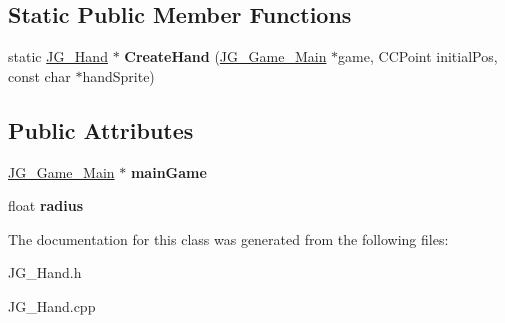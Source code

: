 \subsection*{Static Public Member Functions}
\begin{DoxyCompactItemize}
\item 
\hypertarget{class_j_g___hand_a9154307d939ba402a3412a6ff9909247}{static \hyperlink{class_j_g___hand}{J\-G\-\_\-\-Hand} $\ast$ {\bfseries Create\-Hand} (\hyperlink{class_j_g___game___main}{J\-G\-\_\-\-Game\-\_\-\-Main} $\ast$game, C\-C\-Point initial\-Pos, const char $\ast$hand\-Sprite)}\label{class_j_g___hand_a9154307d939ba402a3412a6ff9909247}

\end{DoxyCompactItemize}
\subsection*{Public Attributes}
\begin{DoxyCompactItemize}
\item 
\hypertarget{class_j_g___hand_aaec58a973d275eddd40311f14177461b}{\hyperlink{class_j_g___game___main}{J\-G\-\_\-\-Game\-\_\-\-Main} $\ast$ {\bfseries main\-Game}}\label{class_j_g___hand_aaec58a973d275eddd40311f14177461b}

\item 
\hypertarget{class_j_g___hand_abbebb5b5f2b897af0fa566477c817c96}{float {\bfseries radius}}\label{class_j_g___hand_abbebb5b5f2b897af0fa566477c817c96}

\end{DoxyCompactItemize}


The documentation for this class was generated from the following files\-:\begin{DoxyCompactItemize}
\item 
J\-G\-\_\-\-Hand.\-h\item 
J\-G\-\_\-\-Hand.\-cpp\end{DoxyCompactItemize}
